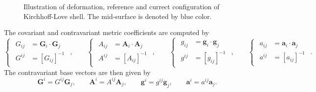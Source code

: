 \begin{figure}[h]
	\center
	\caption{Illustration of deformation, reference and currect configuration of Kirchhoff-Love shell. The mid-surface is denoted by blue color.}
	\label{fig:shell_configuration}
\end{figure}
The covariant and contravariant metric coefficients are computed by
\begin{equation}
	\label{eq:covariant_contravariant_metric}
	\begin{cases}
		\begin{aligned}
			G_{ij} & =\mathbf{G}_i\cdot\mathbf{G}_j \\
			G^{ij} & =\left[G_{ij}\right]^{-1}
		\end{aligned}
	\end{cases},\qquad
	\begin{cases}
		\begin{aligned}
			A_{ij} & =\mathbf{A}_i\cdot\mathbf{A}_j \\
			A^{ij} & =\left[A_{ij}\right]^{-1}
		\end{aligned}
	\end{cases},\qquad
	\begin{cases}
		\begin{aligned}
			g_{ij} & =\mathbf{g}_i\cdot\mathbf{g}_j \\
			g^{ij} & =\left[g_{ij}\right]^{-1}
		\end{aligned}
	\end{cases},\qquad
	\begin{cases}
		\begin{aligned}
			a_{ij} & =\mathbf{a}_i\cdot\mathbf{a}_j \\
			a^{ij} & =\left[a_{ij}\right]^{-1}
		\end{aligned}
	\end{cases}.
\end{equation}
The contravariant base vectors are then given by
\begin{equation}
	\label{eq:contravariant_base_vector}
	\mathbf{G}^i = G^{ij}\mathbf{G}_j,\qquad \mathbf{A}^i = A^{ij}\mathbf{A}_j,\qquad \mathbf{g}^i = g^{ij}\mathbf{g}_j,\qquad \mathbf{a}^i = a^{ij}\mathbf{a}_j.
\end{equation}

